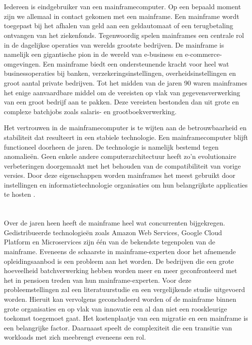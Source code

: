 \section{}

Iedereen is eindgebruiker van een mainframecomputer. Op een bepaald moment zijn we allemaal in contact gekomen met een mainframe. Een mainframe wordt toegepast bij het afhalen van geld aan een geldautomaat of een terugbetaling ontvangen van het ziekenfonds. Tegenwoordig spelen mainframes een centrale rol in de dagelijkse operaties van werelds grootste bedrijven. De mainframe is namelijk een gigantische pion in de wereld van e-business en e-commerce-omgevingen. Een mainframe biedt een ondersteunende kracht voor heel wat businessoperaties bij banken, verzekeringsinstellingen, overheidsinstellingen en groot aantal private bedrijven. Tot het midden van de jaren 90 waren mainframes het enige aanvaardbare middel om de vereisten op vlak van gegevensverwerking van een groot bedrijf aan te pakken. Deze vereisten bestonden dan uit grote en complexe batchjobs zoals salaris- en grootboekverwerking.

Het vertrouwen in de mainframecomputer is te wijten aan de betrouwbaarheid en stabiliteit dat resulteert in een stabiele technologie. Een mainframecomputer blijft functioneel doorheen de jaren. De technologie is namelijk bestemd tegen anomalieën. Geen enkele andere computerarchitectuur heeft zo'n evolutionaire verbeteringen doorgemaakt met het behouden van de compatibiliteit van vorige versies. Door deze eigenschappen worden mainframes het meest gebruikt door instellingen en informatietechnologie organisaties om hun belangrijkste applicaties te hosten \autocite{Ebbers2022}. 


\section{}
\label{sec:probleemstelling}

Over de jaren heen heeft de mainframe heel wat concurrenten bijgekregen. Gedistribueerde technologieën zoals Amazon Web Services, Google Cloud Platform en Microservices zijn één van de bekendste tegenpolen van de mainframe. Eveneens de schaarste in mainframe-experten door het afnemende opleidingsaanbod is een probleem aan het worden. De bedrijven die een grote hoeveelheid batchverwerking hebben worden meer en meer geconfronteerd met het in pensioen treden van hun mainframe-experten. Voor deze probleemstellingen zal een literatuurstudie en een vergelijkende studie uitgevoerd worden. Hieruit kan vervolgens geconcludeerd worden of de mainframe binnen grote organisaties en op vlak van innovatie een al dan niet een rooskleurige toekomst toegemoet gaat. Het kostenplaatje van een migratie en een mainframe is een belangrijke factor. Daarnaast speelt de complexiteit die een transitie van workloads met zich meebrengt eveneens een rol. 

